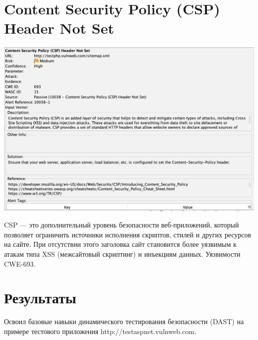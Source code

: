\documentclass{article}
\begin{document}
\section{Content Security Policy (CSP) Header Not Set}
\begin{center}
  \includegraphics[width=.9\textwidth]{6}
\end{center}
CSP — это дополнительный уровень безопасности веб-приложений, который позволяет ограничить источники исполнения скриптов, стилей и других ресурсов на сайте. При отсутствии этого заголовка сайт становится более уязвимым к атакам типа XSS (межсайтовый скриптинг) и инъекциям данных.
Уязвимости CWE-693.

\section*{Результаты}

Освоил базовые навыки динамического тестирования безопасности (DAST) на
примере тестового приложения http://testaspnet.vulnweb.com.
\end{document}
